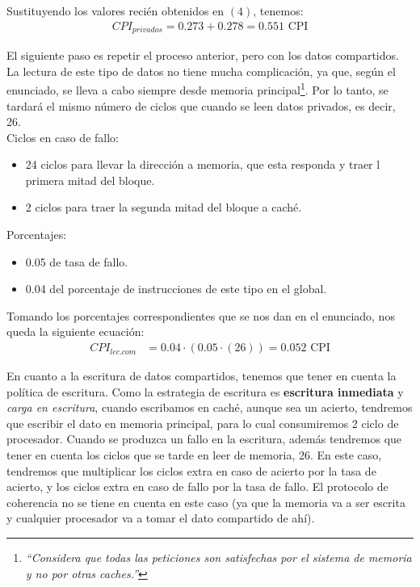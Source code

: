 \documentclass[12pt,a4paper]{article}
\begin{document}
Sustituyendo los valores recién obtenidos en $(4)$, tenemos:
\begin{align*}
CPI_{privados}=0.273+0.278=0.551 \text{ CPI}
\end{align*}

El siguiente paso es repetir el proceso anterior, pero con los datos compartidos. La lectura de este tipo de datos no tiene mucha complicación, ya que, según el enunciado, se lleva a cabo siempre desde memoria principal\footnote{\textit{``Considera que todas las peticiones son satisfechas por el sistema de memoria y no por otras caches.''}}. Por lo tanto, se tardará el mismo número de ciclos que cuando se leen datos privados, es decir, 26.\\

Ciclos en caso de fallo:
\begin{itemize}
\item 24 ciclos para llevar la dirección a memoria, que esta responda y traer l primera mitad del bloque.
\item 2 ciclos para traer la segunda mitad del bloque a caché.
\end{itemize}

Porcentajes:
\begin{itemize}
\item 0.05 de tasa de fallo.
\item 0.04 del porcentaje de instrucciones de este tipo en el global.
\end{itemize}

Tomando los porcentajes correspondientes que se nos dan en el enunciado, nos queda la siguiente ecuación:
\begin{align*}
CPI_{lec.com}&=0.04\cdot (0.05\cdot (26))=0.052\text{ CPI}
\end{align*}

En cuanto a la escritura de datos compartidos, tenemos que tener en cuenta la política de escritura. Como la estrategia de escritura es \textbf{escritura inmediata} y \textit{carga en escritura}, cuando escribamos en caché, aunque sea un acierto, tendremos que escribir el dato en memoria principal, para lo cual consumiremos 2 ciclo de procesador. Cuando se produzca un fallo en la escritura, además tendremos que tener en cuenta los ciclos que se tarde en leer de memoria, 26. En este caso, tendremos que multiplicar los ciclos extra en caso de acierto por la tasa de acierto, y los ciclos extra en caso de fallo por la tasa de fallo. El protocolo de coherencia no se tiene en cuenta en este caso (ya que la memoria va a ser escrita y cualquier procesador va a tomar el dato compartido de ahí). \\
\end{document}
